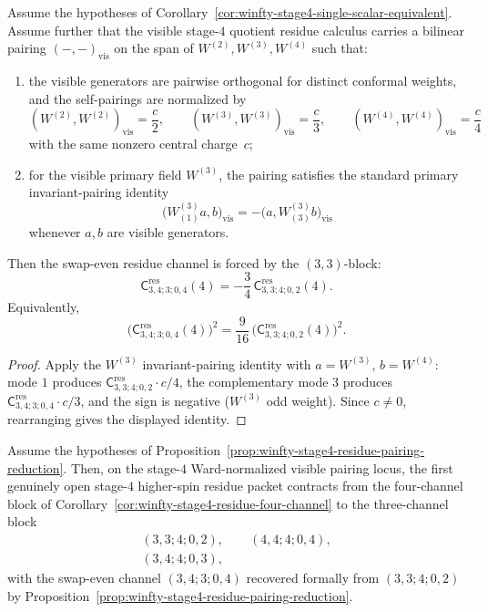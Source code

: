 \begin{proposition}
\label{prop:winfty-stage4-residue-pairing-reduction}
Assume the hypotheses of
Corollary~\ref{cor:winfty-stage4-single-scalar-equivalent}. Assume
further that the visible stage-$4$ quotient residue calculus carries a
bilinear pairing \((-, -)_{\mathrm{vis}}\) on the span of
\(W^{(2)},W^{(3)},W^{(4)}\) such that:
\begin{enumerate}[label=\textup{(\roman*)}]
\item the visible generators are pairwise orthogonal for distinct
 conformal weights, and the self-pairings are normalized by
 \[
 (W^{(2)},W^{(2)})_{\mathrm{vis}}=\frac{c}{2},\qquad
 (W^{(3)},W^{(3)})_{\mathrm{vis}}=\frac{c}{3},\qquad
 (W^{(4)},W^{(4)})_{\mathrm{vis}}=\frac{c}{4}
 \]
 with the same nonzero central charge~\(c\);
\item for the visible primary field \(W^{(3)}\), the pairing satisfies
 the standard primary invariant-pairing identity
 \[
 \bigl(W^{(3)}_{(1)}a,b\bigr)_{\mathrm{vis}}
 =
 -\bigl(a,W^{(3)}_{(3)}b\bigr)_{\mathrm{vis}}
 \]
 whenever \(a,b\) are visible generators.
\end{enumerate}
Then the swap-even residue channel is forced by the \((3,3)\)-block:
\[
\mathsf{C}^{\mathrm{res}}_{3,4;3;0,4}(4)
=
-\frac{3}{4}\,
\mathsf{C}^{\mathrm{res}}_{3,3;4;0,2}(4).
\]
Equivalently,
\[
\bigl(\mathsf{C}^{\mathrm{res}}_{3,4;3;0,4}(4)\bigr)^2
=
\frac{9}{16}\,
\bigl(\mathsf{C}^{\mathrm{res}}_{3,3;4;0,2}(4)\bigr)^2.
\]
\end{proposition}

\begin{proof}
Apply the $W^{(3)}$ invariant-pairing identity with $a=W^{(3)}$, $b=W^{(4)}$: mode $1$ produces $\mathsf{C}^{\mathrm{res}}_{3,3;4;0,2}\cdot c/4$, the complementary mode $3$ produces $\mathsf{C}^{\mathrm{res}}_{3,4;3;0,4}\cdot c/3$, and the sign is negative ($W^{(3)}$ odd weight). Since $c\neq 0$, rearranging gives the displayed identity.
\end{proof}

\begin{corollary}
\label{cor:winfty-stage4-residue-three-channel}
Assume the hypotheses of
Proposition~\ref{prop:winfty-stage4-residue-pairing-reduction}. Then,
on the stage-$4$ Ward-normalized visible pairing locus, the first
genuinely open stage-$4$ higher-spin residue packet contracts from the
four-channel block of
Corollary~\ref{cor:winfty-stage4-residue-four-channel} to the
three-channel block
\[
\begin{gathered}
(3,3;4;0,2),\qquad
(4,4;4;0,4),\\
(3,4;4;0,3),
\end{gathered}
\]
with the swap-even channel \((3,4;3;0,4)\) recovered formally from
\((3,3;4;0,2)\) by
Proposition~\ref{prop:winfty-stage4-residue-pairing-reduction}.
\end{corollary}


